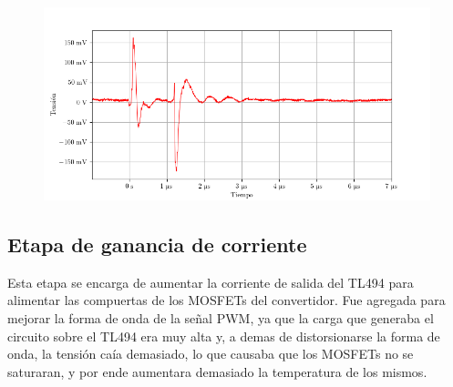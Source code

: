 
\begin{figure}[H]
    \centering
    \includegraphics[width=\textwidth]{images/capturas-osciloscopio/TL494/DTC_v.png}
    \caption{} %
    \label{fig:dtc_v}
\end{figure}






\subsection{Etapa de ganancia de corriente}

Esta etapa se encarga de aumentar la corriente de salida del TL494 para alimentar las compuertas de los MOSFETs del convertidor.
Fue agregada para mejorar la forma de onda de la señal PWM, ya que la carga que generaba el circuito sobre el TL494 era muy alta y, a demas de distorsionarse la forma de onda, la tensión caía demasiado, lo que causaba que los MOSFETs no se saturaran, y por ende aumentara demasiado la temperatura de los mismos.

